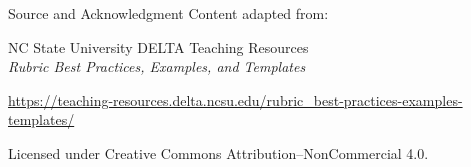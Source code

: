 \documentclass{beamer}
\begin{document}
\begin{frame}{Source and Acknowledgment}
Content adapted from:

\vspace{0.3cm}
\small
NC State University DELTA Teaching Resources\\
\textit{Rubric Best Practices, Examples, and Templates}

\vspace{0.3cm}
\url{https://teaching-resources.delta.ncsu.edu/rubric_best-practices-examples-templates/}

\vspace{0.3cm}
Licensed under Creative Commons Attribution–NonCommercial 4.0.
\end{frame}
\end{document}
